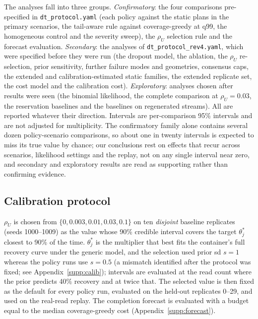 \documentclass[acmsmall,screen]{acmart}
\begin{document}
The analyses fall into three groups.  \emph{Confirmatory}: the four comparisons pre-specified in
\texttt{dt\_protocol.yaml} (each policy against the static plans in the primary scenarios, the
tail-aware rule against coverage-greedy at q99, the homogeneous control and the severity sweep), the
$\rho_U$ selection rule and the forecast evaluation.  \emph{Secondary}: the analyses of
\texttt{dt\_protocol\_rev4.yaml}, which were specified before they were run (the dropout model, the
ablation, the $\rho_U$ re-selection, prior sensitivity, further failure modes and geometries, consensus
caps, the extended and calibration-estimated static families, the extended replicate set, the cost model
and the calibration cost).  \emph{Exploratory}: analyses chosen after results were seen (the binomial
likelihood, the complete comparison at $\rho_U{=}0.03$, the reservation baselines and the baselines on
regenerated streams).  All are reported whatever their direction.  Intervals are per-comparison 95\%
intervals and are not adjusted for multiplicity.  The confirmatory family alone contains several dozen
policy-scenario comparisons, so about one in twenty intervals is expected to miss its true value by
chance; our conclusions rest on effects that recur across scenarios, likelihood settings and the replay,
not on any single interval near zero, and secondary and exploratory results are read as supporting rather
than confirming evidence.

\subsection{Calibration protocol}\label{sec:calib-protocol}
$\rho_U$ is chosen from $\{0, 0.003, 0.01, 0.03, 0.1\}$ on ten \emph{disjoint} baseline
replicates (seeds 1000--1009) as the value whose 90\% credible interval covers the target
$\theta^\ast_j$ closest to 90\% of the time.  $\theta^\ast_j$ is the multiplier that best fits the
container's full recovery curve under the generic model, and the selection used prior sd $s{=}1$
whereas the policy runs use $s{=}0.5$ (a mismatch identified after the protocol was fixed; see
Appendix~\ref{supp:calib}); intervals are evaluated at the read
count where the prior predicts 40\% recovery and at twice that.  The selected value is then fixed
as the default for every policy run, evaluated on the held-out replicates 0--29, and used on
the real-read replay.  The completion forecast is evaluated with a budget equal to the median
coverage-greedy cost (Appendix~\ref{supp:forecast}).
\end{document}
